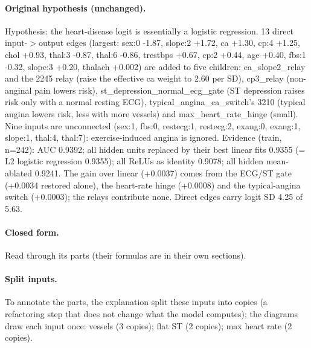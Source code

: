 \documentclass[a4paper,10pt]{article}
\newif\ifreviewmarks
\newcommand{\reviewrule}{\noindent{\color{BrickRed}\rule{\linewidth}{0.8pt}}}
\newenvironment{drafted}[1][]{%
  \ifreviewmarks\par\addvspace{\medskipamount}\reviewrule\par\nopagebreak
  \noindent{\color{BrickRed}\sffamily\footnotesize\textbf{Thesis Draft}\quad #1\hfill review}\par\nopagebreak\smallskip\fi}{%
  \ifreviewmarks\par\smallskip\noindent{\color{BrickRed}\sffamily\footnotesize end of thesis draft}\par\nopagebreak\reviewrule\par\medskip\fi}
\begin{document}
\begin{drafted}[plain-language layer: heart-s1-c1]
\paragraph{Original hypothesis (unchanged).} Hypothesis: the heart-disease logit is essentially a logistic regression. 13 direct input-$>$output edges (largest: sex:0 -1.87, slope:2 +1.72, ca +1.30, cp:4 +1.25, chol +0.93, thal:3 -0.87, thal:6 -0.86, trestbps +0.67, cp:2 +0.44, age +0.40, fbs:1 -0.32, slope:3 +0.20, thalach +0.002) are added to five children: ca\_\allowbreak{}slope2\_\allowbreak{}relay and the 2245 relay (raise the effective ca weight to 2.60 per SD), cp3\_\allowbreak{}relay (non-anginal pain lowers risk), st\_\allowbreak{}depression\_\allowbreak{}normal\_\allowbreak{}ecg\_\allowbreak{}gate (ST depression raises risk only with a normal resting ECG), typical\_\allowbreak{}angina\_\allowbreak{}ca\_\allowbreak{}switch's 3210 (typical angina lowers risk, less with more vessels) and max\_\allowbreak{}heart\_\allowbreak{}rate\_\allowbreak{}hinge (small). Nine inputs are unconnected (sex:1, fbs:0, restecg:1, restecg:2, exang:0, exang:1, slope:1, thal:4, thal:7): exercise-induced angina is ignored. Evidence (train, n=242): AUC 0.9392; all hidden units replaced by their best linear fits 0.9355 (= L2 logistic regression 0.9355); all ReLUs as identity 0.9078; all hidden mean-ablated 0.9241. The gain over linear (+0.0037) comes from the ECG/ST gate (+0.0034 restored alone), the heart-rate hinge (+0.0008) and the typical-angina switch (+0.0003); the relays contribute none. Direct edges carry logit SD 4.25 of 5.63.
\paragraph{Closed form.} Read through its parts (their formulas are in their own sections).
\paragraph{Split inputs.} To annotate the parts, the explanation split these inputs into copies (a refactoring step that does not change what the model computes); the diagrams draw each input once: vessels (3 copies); flat ST (2 copies); max heart rate (2 copies).

\end{drafted}
\end{document}
